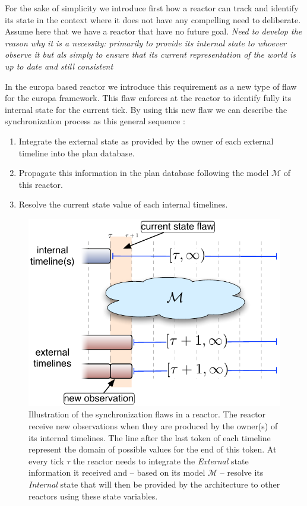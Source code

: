 For the sake of simplicity we introduce first how a reactor can track
and identify its state in the context where it does not have any
compelling need to deliberate. Assume here that we have a reactor that
have no future goal. {\em Need to develop the reason why it is a
  necessity: primarily to provide its internal state to whoever
  observe it but als simply to ensure that its current representation
  of the world is up to date and still consistent}

In the europa based reactor we introduce this requirement as a new
type of flaw for the europa framework. This flaw enforces at the
reactor to identify fully its internal state for the current tick. By
using this new flaw we can describe the synchronization process as
this general sequence :

\begin{enumerate}

\item Integrate the external state as provided by the owner of each
  external timeline into the plan database.

\item Propagate this information in the plan database following the
  model $\mathcal{M}$ of this reactor.

\item Resolve the current state value of each internal timelines.

\end{enumerate}

\begin{figure}[!htbp]
  \centering
  \includegraphics[width=0.5\columnwidth]{figs/synch-relation}
  \caption{Illustration of the synchronization flaws in a reactor. The
    reactor receive new observations when they are produced by the
    owner(s) of its internal timelines. The line after the last token
    of each timeline represent the domain of possible values for the
    end of this token. At every tick $\tau$ the reactor needs to
    integrate the {\em External} state information it received and --
    based on its model $\mathcal{M}$ -- resolve its {\em Internal}
    state that will then be provided by the architecture to other
    reactors using these state variables.}
  \label{fig:synch:flaw}
\end{figure}

